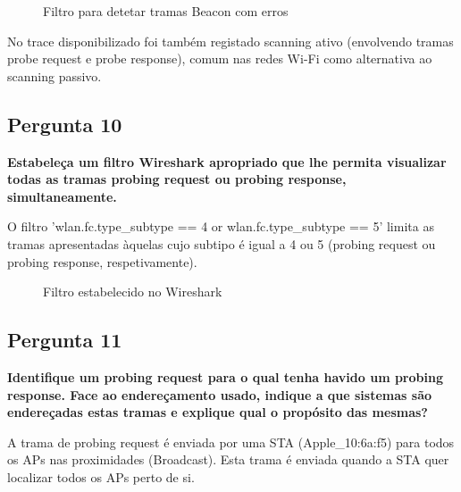 \documentclass[11pt]{article}
\begin{document}
\begin{figure}[hbt!]
    \centering
    \caption{Filtro para detetar tramas Beacon com erros}
\end{figure}


No trace disponibilizado foi também registado scanning ativo (envolvendo tramas probe request e probe response), comum nas redes Wi-Fi como alternativa ao scanning passivo. 

\subsection{Pergunta 10}

\textbf{Estabeleça um filtro Wireshark apropriado que lhe permita visualizar todas as tramas probing request ou probing response, simultaneamente.}

O filtro 'wlan.fc.type\_subtype == 4 or wlan.fc.type\_subtype == 5' limita as tramas apresentadas àquelas cujo subtipo é igual a 4 ou 5 (probing request ou probing response, respetivamente).

\begin{figure}[hbt!]
    \centering
    \caption{Filtro estabelecido no Wireshark}
\end{figure}

\subsection{Pergunta 11}

\textbf{Identifique um probing request para o qual tenha havido um probing response. Face ao endereçamento usado, indique a que sistemas são endereçadas estas tramas e explique qual o propósito das mesmas?}

A trama de probing request é enviada por uma STA (Apple\_10:6a:f5) para todos os APs nas proximidades (Broadcast). Esta trama é enviada quando a STA quer localizar todos os APs perto de si.
\end{document}
